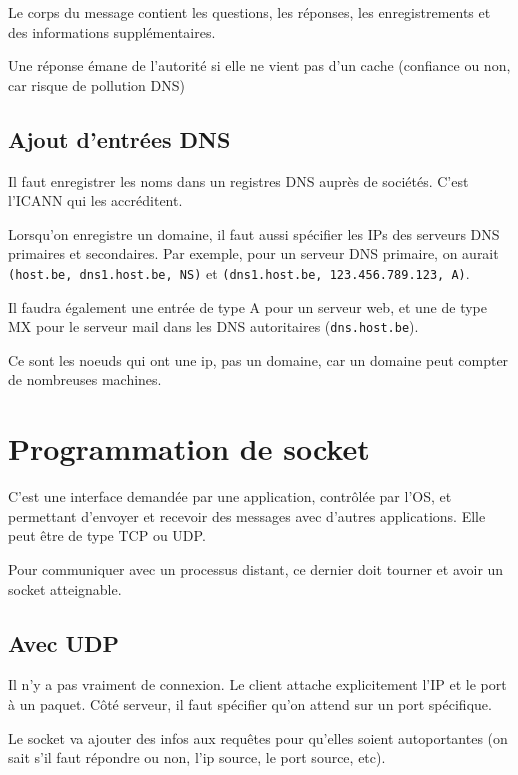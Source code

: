 	
	Le corps du message contient les questions, les réponses, les enregistrements et des informations supplémentaires.
	
	
	
	Une réponse émane de l'autorité si elle ne vient pas d'un cache (confiance ou non, car risque de pollution DNS)

	\subsection{Ajout d'entrées DNS}
	
	Il faut enregistrer les noms dans un registres DNS auprès de sociétés. C'est l'ICANN qui les accréditent.
	
	Lorsqu'on enregistre un domaine, il faut aussi spécifier les IPs des serveurs DNS primaires et secondaires. Par exemple, pour un serveur DNS primaire, on aurait \texttt{(host.be, dns1.host.be, NS)} et \texttt{(dns1.host.be, 123.456.789.123, A)}.
	
	Il faudra également une entrée de type A pour un serveur web, et une de type MX pour le serveur mail dans les DNS autoritaires (\texttt{dns.host.be}).
	
	Ce sont les noeuds qui ont une ip, pas un domaine, car un domaine peut compter de nombreuses machines.
	
\section{Programmation de socket}

C'est une interface demandée par une application, contrôlée par l'OS, et permettant d'envoyer et recevoir des messages avec d'autres applications. Elle peut être de type TCP ou UDP.

Pour communiquer avec un processus distant, ce dernier doit tourner et avoir un socket atteignable.

	\subsection{Avec UDP}
	
	Il n'y a pas vraiment de connexion. Le client attache explicitement l'IP et le port à un paquet. Côté serveur, il faut spécifier qu'on attend sur un port spécifique.
	
	Le socket va ajouter des infos aux requêtes pour qu'elles soient autoportantes (on sait s'il faut répondre ou non, l'ip source, le port source, etc).
	
